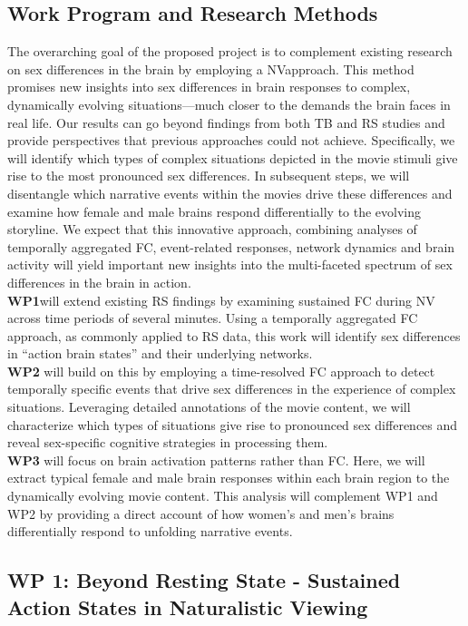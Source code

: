 \documentclass[11pt,a4paper]{article}
\begin{document}
\subsection*{Work Program and Research Methods}
The overarching goal of the proposed project is to complement existing research on sex differences in the brain by 
employing a NVapproach. This method promises new insights into sex differences in brain responses to complex, 
dynamically evolving situations—much closer to the demands the brain faces in real life. Our results can go beyond 
findings from both TB and RS studies and provide perspectives that previous approaches could not achieve. 
Specifically, we will identify which types of complex situations depicted in the movie stimuli give rise to the 
most pronounced sex differences. In subsequent steps, we will disentangle which narrative events within the 
movies drive these differences and examine how female and male brains respond differentially to the evolving storyline. 
We expect that this innovative approach, combining analyses of temporally aggregated 
FC, event-related responses, network dynamics and brain activity will yield important new insights into 
the multi-faceted spectrum of sex differences in the brain in action.\\
\textbf{WP1}will extend existing RS findings by examining sustained FC during NV across time periods of several 
minutes. Using a temporally aggregated FC approach, as commonly applied to RS data, this work will identify 
sex differences in “action brain states” and their underlying networks.\\
\textbf{WP2} will build on this by employing a time-resolved FC approach to detect temporally specific events 
that drive sex differences in the experience of complex situations. Leveraging detailed annotations of the 
movie content, we will characterize which types of situations give rise to pronounced sex differences and 
reveal sex-specific cognitive strategies in processing them.\\
\textbf{WP3} will focus on brain activation patterns rather than FC. Here, we will extract typical female 
and male brain responses within each brain region to the dynamically evolving movie content. This analysis will 
complement WP1 and WP2 by providing a direct account of how women's and men's brains differentially respond 
to unfolding narrative events.

\subsection*{WP 1: Beyond Resting State - Sustained Action States in Naturalistic Viewing}
\end{document}

